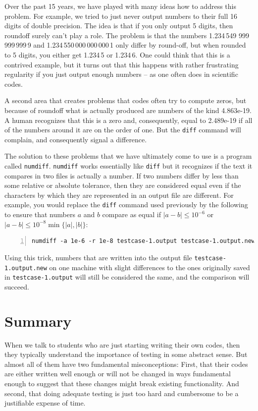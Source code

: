 \documentclass{article}
\begin{document}
Over the past 15 years, we have played with many ideas how to address this
problem. For example, we tried to just never output numbers to their full 16
digits of double precision. The idea is that if you only output 5 digits, then
roundoff surely can't play a role. The problem is that the numbers 1.234\,549
999\,999\,999\,9 and 1.234\,550\,000\,000\,000\,1 only differ by round-off,
but when rounded to 5 digits, you either get 1.234\,5 or 1.234\,6. One could
think that this is a contrived example, but it turns out that this happens
with rather frustrating regularity if you just output enough numbers -- as one
often does in scientific codes.

A second area that creates problems that codes often try to compute zeros, but
because of roundoff what is actually produced are numbers of the kind
4.863e-19. A human recognizes that this is a zero and, consequently, equal to
2.489e-19 if all of the numbers around it are on the order of one. But the
\texttt{diff} command will complain, and consequently signal a difference.

The solution to these problems that we have ultimately come to use
is a program called \texttt{numdiff}. \texttt{numdiff} works essentially like
\texttt{diff} but it recognizes if the text it compares in two files is
actually a number. If two numbers differ by less than some relative or
absolute tolerance, then they are considered equal even if the characters by
which they are represented in an output file are different. For example, you
would replace the \texttt{diff} command used previously by the
following to ensure that numbers $a$ and $b$ compare as equal if $|a-b|\le
10^{-6}$ or $|a-b|\le 10^{-8} \min\{|a|,|b|\}$:
\begin{lstlisting}[frame=single,basicstyle=\footnotesize,numbers=left,language=csh]
  numdiff -a 1e-6 -r 1e-8 testcase-1.output testcase-1.output.new
\end{lstlisting}
Using this trick, numbers that are written into the output file
\texttt{testcase-1.output.new} on one machine with slight differences to the
ones originally saved in \texttt{testcase-1.output} will still be considered
the same, and the comparison will succeed.



\section{Summary}
\label{sec:conclusions}

When we talk to students who are just starting writing their own codes, then
they typically understand the importance of testing in some abstract
sense. But almost all of them have two fundamental misconceptions: First, that
their codes are either written well enough or will not be changed in ways
fundamental enough to suggest that these changes might break existing
functionality. And second, that doing adequate testing is just too hard and
cumbersome to be a justifiable expense of time.
\end{document}

